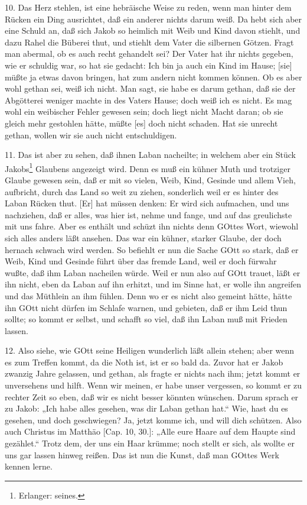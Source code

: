10. Das Herz stehlen, ist eine hebräische Weise zu reden, wenn man hinter dem Rücken ein Ding ausrichtet, daß ein anderer nichts darum weiß. Da hebt sich aber eine Schuld an, daß sich Jakob so heimlich mit Weib und Kind davon stiehlt, und dazu Rahel die Büberei thut, und stiehlt dem Vater die silbernen Götzen. Fragt man abermal, ob es auch recht gehandelt sei? Der Vater hat ihr nichts gegeben, wie er schuldig war, so hat sie gedacht: Ich bin ja auch ein Kind im Hause; [sie] müßte ja etwas davon bringen, hat zum andern nicht kommen können. Ob es aber wohl gethan sei, weiß ich nicht. Man sagt, sie habe es darum gethan, daß sie der Abgötterei weniger machte in des Vaters Hause; doch weiß ich es nicht. Es mag wohl ein weibischer Fehler gewesen sein; doch liegt nicht Macht daran; ob sie gleich mehr gestohlen hätte, müßte [es] doch nicht schaden. Hat sie unrecht gethan, wollen wir sie auch nicht entschuldigen.

11. Das ist aber zu sehen, daß ihnen Laban nacheilte; in welchem aber ein Stück Jakobs\footnote{Erlanger: seines.} Glaubens angezeigt wird. Denn es muß ein kühner Muth und trotziger Glaube gewesen sein, daß er mit so vielen, Weib, Kind, Gesinde und allem Vieh, aufbricht, durch das Land so weit zu ziehen, sonderlich weil er es hinter des Laban Rücken thut. [Er] hat müssen denken: Er wird sich aufmachen, und uns nachziehen, daß er alles, was hier ist, nehme und fange, und auf das greulichste mit uns fahre. Aber es enthält und schüzt ihn nichts denn GOttes Wort, wiewohl sich alles anders läßt ansehen. Das war ein kühner, starker Glaube, der doch hernach schwach wird werden. So befiehlt er nun die Sache GOtt so stark, daß er Weib, Kind und Gesinde führt über das fremde Land, weil er doch fürwahr wußte, daß ihm Laban nacheilen würde. Weil er nun also auf GOtt trauet, läßt er ihn nicht, eben da Laban auf ihn erhitzt, und im Sinne hat, er wolle ihn angreifen und das Müthlein an ihm fühlen. Denn wo er es nicht also gemeint hätte, hätte ihn GOtt nicht dürfen im Schlafe warnen, und gebieten, daß er ihm Leid thun sollte; so kommt er selbst, und schafft so viel, daß ihn Laban muß mit Frieden lassen.

12. Also siehe, wie GOtt seine Heiligen wunderlich läßt allein stehen; aber wenn es zum
Treffen kommt, da die Noth ist, ist er so bald da. Zuvor hat er Jakob zwanzig Jahre gelassen, und gethan, als fragte er nichts nach ihm; jetzt kommt er unversehens und hilft. Wenn wir meinen, er habe unser vergessen, so kommt er zu rechter Zeit so eben, daß wir es nicht besser könnten wünschen. Darum sprach er zu Jakob: „Ich habe alles gesehen, was dir Laban gethan hat.“ Wie, hast du es gesehen, und doch geschwiegen? Ja, jetzt komme ich, und will dich schützen. Also auch Christus im Matthäo [Cap. 10, 30.]: „Alle eure Haare auf dem Haupte sind gezählet.“ Trotz dem, der uns ein Haar krümme; noch stellt er sich, als wollte er uns gar lassen hinweg reißen. Das ist nun die Kunst, daß man GOttes Werk kennen lerne.

